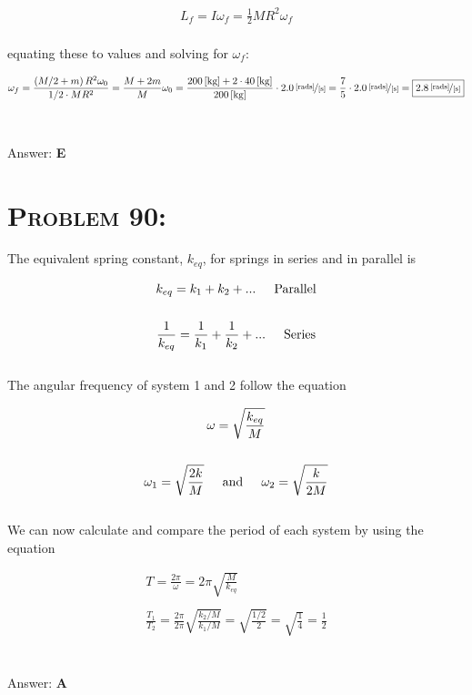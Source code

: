 \documentclass{article}
\begin{document}
\begin{gather}
L_{f} = I\omega_{f} = \frac{1}{2} M R^{2}\omega_{f}
\end{gather}
\\
equating these to values and solving for $\omega_{f}$:

\begin{gather}
\omega_{f} = \frac    {\left( M/2 + m \right) R^{2}  \omega_{0}}   { 1/2 \cdot M R^{2}} = \frac{M + 2m}{M} \omega_{0} =  \frac{\unit[200]{[kg]} + 2\cdot \unit[40]{[kg]}}{\unit[200]{[kg]}} \cdot \unitfrac[2.0]{[rads]}{[s]} = \frac{7}{5} \cdot \unitfrac[2.0]{[rads]}{[s]} = \boxed{\unitfrac[2.8]{[rads]}{[s]}} \nonumber
\end{gather}
\\\\
Answer: \textbf{\textcolor{ProcessBlue}E}\\


\section{\textsc{Problem 90:}} The equivalent spring constant, $k_{eq}$, for springs in series and in parallel is

\begin{gather}
k_{eq} = k_{1} + k_{2} + ... \hspace{.2in} \text{Parallel}\\
\nonumber\\
\frac{1}{k_{eq}} = \frac{1}{k_{1}} + \frac{1}{k_{2}} + ... \hspace{.2in} \text{Series}
\end{gather}
\\
The angular frequency of system 1 and 2 follow the equation

\begin{gather}
\omega = \sqrt{\frac{k_{eq}}{M}}\\
\nonumber\\
\omega_{1} = \sqrt{\frac{2k}{M}}   \hspace{.2in} \text{and} \hspace{.2in} \omega_{2} = \sqrt{\frac{k}{2M}}\nonumber
\end{gather}
\\
We can now calculate and compare the period of each system by using the equation

\begin{gather}
T = \frac{2 \pi}{\omega} = 2 \pi \sqrt{\frac{M}{k_{eq}}}\\
\nonumber\\
\frac{T_{1}}{T_{2}} = \frac{2 \pi} {2 \pi} \sqrt{\frac{k_{2}/M}{k_{1}/M}} = \sqrt{\frac{1/2}{2}} = \sqrt{\frac{1}{4}} = \boxed{\frac{1}{2}}\nonumber
\end{gather}
\\\\
Answer: \textbf{\textcolor{ProcessBlue}A}\\
\end{document}
